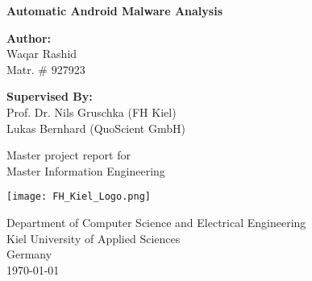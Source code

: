 \documentclass[../main.tex]{subfile}
\begin{document}



\begin{titlepage}
	\begin{center}
		\vspace*{3cm}
		
		\Huge
		\textbf{Automatic Android Malware Analysis}
		
		\vspace{0.5cm}
		\LARGE	
		\vspace{1.5cm}
		
		\textbf{Author:}\\
		Waqar Rashid\\
		Matr. \# 927923

		\vspace{1.5cm}
		\textbf{Supervised By:}\\
		Prof. Dr. Nils Gruschka (FH Kiel)\\
		Lukas Bernhard (QuoScient GmbH)
		
		
		\vfill
		
		Master project report for \\
		Master Information Engineering
		
		\vspace{0.8cm}
		
		\texttt{[image: FH\_Kiel\_Logo.png]}
		
		\Large
		Department of Computer Science and Electrical Engineering\\
		Kiel University of Applied Sciences\\
		Germany\\
		\today
		
	\end{center}
\end{titlepage}
\end{document}
